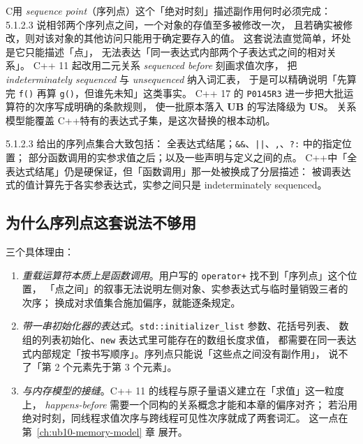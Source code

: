 \documentclass[12pt,a4paper,fontset=fandol]{ctexbook}
\newcommand{\Tp}[1]{\texttt{#1}}
\newcommand{\Lang}[1]{\textsf{#1}}
\newcommand{\CL}{\Lang{C}}
\newcommand{\CPP}{\Lang{C++}}
\newcommand{\UB}{\textbf{\textsf{UB}}}
\newcommand{\USB}{\textbf{\textsf{US}}}
\newcommand{\Clause}[1]{\textsc{\small #1}}
\newcommand{\Feat}[1]{\texttt{#1}}
\begin{document}
\begin{compare}[title={序列点模型与先后关系模型}]
\CL 用 \emph{sequence point}（序列点）这个「绝对时刻」描述副作用何时必须完成：
\Clause{5.1.2.3} 说相邻两个序列点之间，一个对象的存值至多被修改一次，
且若确实被修改，则对该对象的其他访问只能用于确定要存入的值。
这套说法直觉简单，坏处是它只能描述「点」，
无法表达「同一表达式内部两个子表达式之间的相对关系」。
\CPP{} 11 起改用二元关系 \emph{sequenced before} 刻画求值次序，
把 \emph{indeterminately sequenced} 与 \emph{unsequenced} 纳入词汇表，
于是可以精确说明「先算完 \Tp{f()} 再算 \Tp{g()}，但谁先未知」这类事实。
\CPP{} 17 的 \Feat{P0145R3} 进一步把大批运算符的次序写成明确的条款规则，
使一批原本落入 \UB{} 的写法降级为 \USB{}。
关系模型能覆盖 \CPP 特有的表达式子集，是这次替换的根本动机。
\end{compare}

\Clause{5.1.2.3} 给出的序列点集合大致包括：
全表达式结尾；\Tp{\&\&}、\Tp{||}、\Tp{,}、\Tp{?:} 中的指定位置；
部分函数调用的实参求值之后；以及一些声明与定义之间的点。
\CPP 中「全表达式结尾」仍是硬保证，但「函数调用」那一处被换成了分层描述：
被调表达式的值计算先于各实参表达式，实参之间只是 indeterminately sequenced。

\subsection{为什么序列点这套说法不够用}\label{sec:ub08-why-sp-fails}

三个具体理由：

\begin{enumerate}
\item \emph{重载运算符本质上是函数调用}。用户写的 \Tp{operator+} 找不到「序列点」这个位置，
      「点之间」的叙事无法说明左侧对象、实参表达式与临时量销毁三者的次序；
      换成对求值集合施加偏序，就能逐条规定。
\item \emph{带一串初始化器的表达式}。\Tp{std::initializer\_list} 参数、花括号列表、
      数组的列表初始化、\Tp{new} 表达式里可能存在的数组长度求值，
      都需要在同一表达式内部规定「按书写顺序」。序列点只能说「这些点之间没有副作用」，
      说不了「第 2 个元素先于第 3 个元素」。
\item \emph{与内存模型的接缝}。\CPP{} 11 的线程与原子量语义建立在「求值」这一粒度上，
      \emph{happens-before} 需要一个同构的关系概念才能和本章的偏序对齐；
      若沿用绝对时刻，同线程求值次序与跨线程可见性次序就成了两套词汇。
      这一点在 第~\ref{ch:ub10-memory-model} 章 展开。
\end{enumerate}
\end{document}
